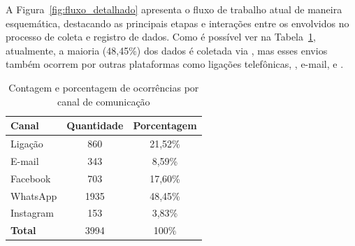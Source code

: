 A Figura~\ref{fig:fluxo_detalhado} apresenta o fluxo de trabalho atual de maneira esquemática, 
destacando as principais etapas e interações entre os envolvidos no processo de coleta e registro de dados.
Como é possível ver na Tabela~\ref{tab:contagem_ocorrencias}, atualmente, a maioria (48,45\%) dos dados 
é coletada via , mas esses envios também ocorrem por outras plataformas 
como ligações telefônicas, , e-mail, e .

\begin{table}[h]
    \centering
    \begin{tabular}{|l|c|c|}
    \hline
    \textbf{Canal}     & \textbf{Quantidade} & \textbf{Porcentagem} \\
    \hline
    Ligação     & 860  & 21,52\% \\
    E-mail       & 343  & 8,59\%  \\
    Facebook    & 703  & 17,60\% \\
    WhatsApp    & 1935 & 48,45\% \\
    Instagram   & 153  & 3,83\%  \\
    \hline
    \textbf{Total}     & 3994 & 100\% \\
    \hline
    \end{tabular}
    \caption{Contagem e porcentagem de ocorrências por canal de comunicação}
    \label{tab:contagem_ocorrencias}
\end{table}

